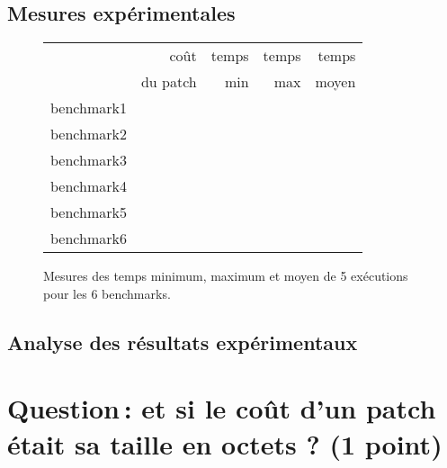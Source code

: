 \documentclass[a4paper, 10pt, french]{article}
\begin{document}
  \subsection{Mesures expérimentales}

    \begin{figure}[h]
      \begin{center}
        \begin{tabular}{|l||r||r|r|r||}
          \hline
          \hline
            & coût         & temps     & temps   & temps \\
            & du patch     & min       & max     & moyen \\
          \hline
          \hline
            benchmark1 &      &     &     &     \\
          \hline
            benchmark2 &      &     &     &     \\
          \hline
            benchmark3 &      &     &     &     \\
          \hline
            benchmark4 &      &     &     &     \\
          \hline
            benchmark5 &      &     &     &     \\
          \hline
            benchmark6 &      &     &     &     \\
          \hline
          \hline
        \end{tabular}
        \caption{Mesures des temps minimum, maximum et moyen de 5 exécutions pour les 6 benchmarks.}
        \label{table-temps}
      \end{center}
    \end{figure}

\subsection{Analyse des résultats expérimentaux}

\section{Question\,: et  si le coût d'un patch était sa taille en octets ? (1 point)}
\end{document}
